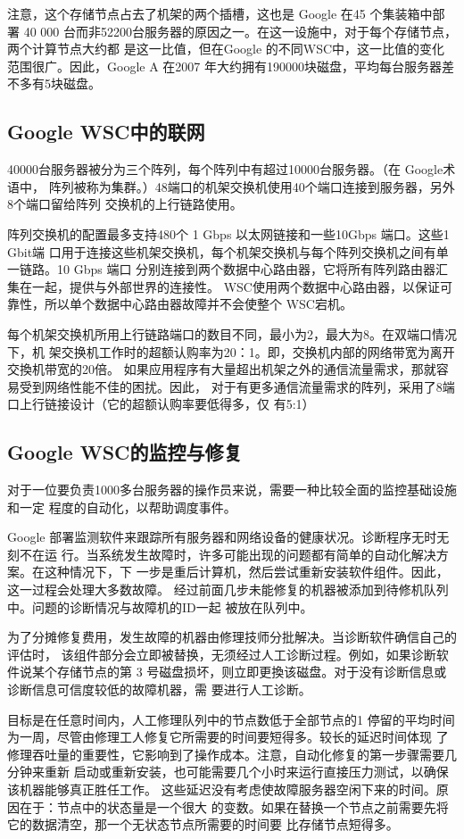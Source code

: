 注意，这个存储节点占去了机架的两个插槽，这也是 Google 在45 个集装箱中部署 40 000
台而非52200台服务器的原因之一。在这一设施中，对于每个存储节点，两个计算节点大约都
是这一比值，但在Google 的不同WSC中，这一比值的变化范围很广。因此，Google A 在2007
年大约拥有190000块磁盘，平均每台服务器差不多有5块磁盘。

\subsection{Google WSC中的联网}
40000台服务器被分为三个阵列，每个阵列中有超过10000台服务器。（在 Google术语中，
阵列被称为集群。）48端口的机架交换机使用40个端口连接到服务器，另外8个端口留给阵列
交换机的上行链路使用。

阵列交换机的配置最多支持480个 1 Gbps 以太网链接和一些10Gbps 端口。这些1 Gbit端
口用于连接这些机架交换机，每个机架交换机与每个阵列交换机之间有单一链路。10 Gbps 端口
分别连接到两个数据中心路由器，它将所有阵列路由器汇集在一起，提供与外部世界的连接性。
WSC使用两个数据中心路由器，以保证可靠性，所以单个数据中心路由器故障并不会使整个
WSC宕机。

每个机架交换机所用上行链路端口的数目不同，最小为2，最大为8。在双端口情况下，机
架交换机工作时的超额认购率为20：1。即，交换机内部的网络带宽为离开交換机带宽的20倍。
如果应用程序有大量超出机架之外的通信流量需求，那就容易受到网络性能不佳的困扰。因此，
对于有更多通信流量需求的阵列，采用了8端口上行链接设计（它的超额认购率要低得多，仅
有5:1）

\subsection{Google WSC的监控与修复}

对于一位要负责1000多台服务器的操作员来说，需要一种比较全面的监控基础设施和一定
程度的自动化，以帮助调度事件。

Google 部署监测软件来跟踪所有服务器和网络设备的健康状况。诊断程序无时无刻不在运
行。当系统发生故障时，许多可能出现的问题都有简单的自动化解决方案。在这种情况下，下
一步是重后计算机，然后尝试重新安装软件组件。因此，这一过程会处理大多数故障。
经过前面几步未能修复的机器被添加到待修机队列中。问题的诊断情况与故障机的ID一起
被放在队列中。

为了分摊修复费用，发生故障的机器由修理技师分批解决。当诊断软件确信自己的评估时，
该组件部分会立即被替换，无须经过人工诊断过程。例如，如果诊断软件说某个存储节点的第
3 号磁盘损坏，则立即更換该磁盘。对于没有诊断信息或诊断信息可信度较低的故障机器，需
要进行人工诊断。

目标是在任意时间内，人工修理队列中的节点数低于全部节点的1%
停留的平均时间为一周，尽管由修理工人修复它所需要的时间要短得多。较长的延迟时间体现
了修理吞吐量的重要性，它影响到了操作成本。注意，自动化修复的第一步骤需要几分钟来重新
启动或重新安装，也可能需要几个小时来运行直接压力测试，以确保该机器能够真正胜任工作。
这些延迟没有考虑使故障服务器空闲下来的时间。原因在于：节点中的状态量是一个很大
的变数。如果在替换一个节点之前需要先将它的数据清空，那一个无状态节点所需要的时间要
比存储节点短得多。

